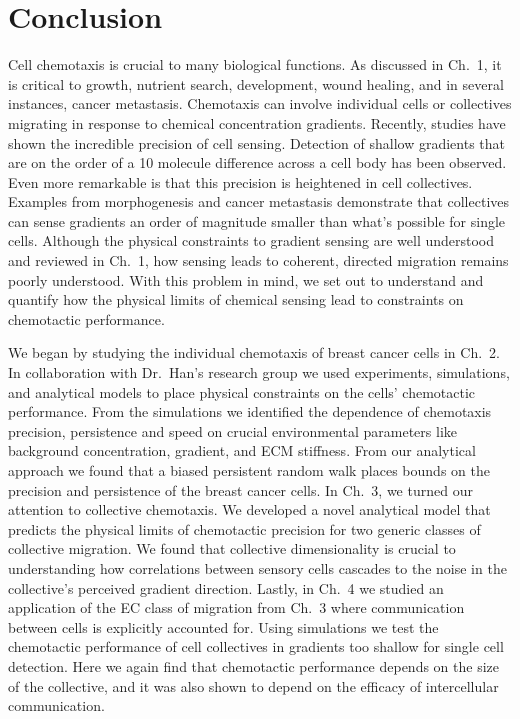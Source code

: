 
\chapter{Conclusion}

\noindent
Cell chemotaxis is crucial to many biological functions. As discussed in Ch.\ 1, it is critical to growth, nutrient search, development, wound healing, and in several instances, cancer metastasis. Chemotaxis can involve individual cells or collectives migrating in response to chemical concentration gradients. Recently, studies have shown the incredible precision of cell sensing. Detection of shallow gradients that are on the order of a 10 molecule difference across a cell body has been observed. Even more remarkable is that this precision is heightened in cell collectives. Examples from morphogenesis and cancer metastasis demonstrate that collectives can sense gradients an order of magnitude smaller than what's possible for single cells. Although the physical constraints to gradient sensing are well understood and reviewed in Ch.\ 1, how sensing leads to coherent, directed migration remains poorly understood. With this problem in mind, we set out to understand and quantify how the physical limits of chemical sensing lead to constraints on chemotactic performance.

We began by studying the individual chemotaxis of breast cancer cells in Ch.\ 2. In collaboration with Dr.\ Han's research group we used experiments, simulations, and analytical models to place physical constraints on the cells' chemotactic performance. From the simulations we identified the dependence of chemotaxis precision, persistence and speed on crucial environmental parameters like background concentration, gradient, and ECM stiffness. From our analytical approach we found that a biased persistent random walk places bounds on the precision and persistence of the breast cancer cells. In Ch.\ 3, we turned our attention to collective chemotaxis. We developed a novel analytical model that predicts the physical limits of chemotactic precision for two generic classes of collective migration. We found that collective dimensionality is crucial to understanding how correlations between sensory cells cascades to the noise in the collective's perceived gradient direction. Lastly, in Ch.\ 4 we studied an application of the EC class of migration from Ch.\ 3 where communication between cells is explicitly accounted for. Using simulations we test the chemotactic performance of cell collectives in gradients too shallow for single cell detection. Here we again find that chemotactic performance depends on the size of the collective, and it was also shown to depend on the efficacy of intercellular communication.

